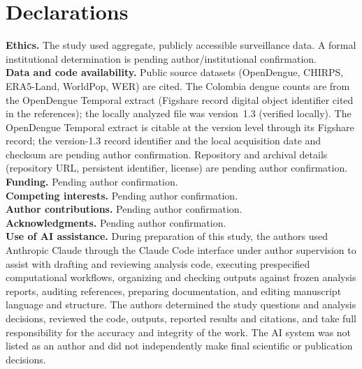 \documentclass[11pt,a4paper]{article}
\begin{document}
\section*{Declarations}
\textbf{Ethics.} The study used aggregate, publicly accessible surveillance data. A formal institutional determination is pending author/institutional confirmation.\\
\textbf{Data and code availability.} Public source datasets (OpenDengue, CHIRPS, ERA5-Land, WorldPop, WER) are cited. The Colombia dengue counts are from the OpenDengue Temporal extract (Figshare record digital object identifier cited in the references); the locally analyzed file was version~1.3 (verified locally). The OpenDengue Temporal extract is citable at the version level through its Figshare record; the version-1.3 record identifier and the local acquisition date and checksum are pending author confirmation. Repository and archival details (repository URL, persistent identifier, license) are pending author confirmation.\\
\textbf{Funding.} Pending author confirmation.\\
\textbf{Competing interests.} Pending author confirmation.\\
\textbf{Author contributions.} Pending author confirmation.\\
\textbf{Acknowledgments.} Pending author confirmation.\\
\textbf{Use of AI assistance.} During preparation of this study, the authors used Anthropic Claude through the Claude Code interface under author supervision to assist with drafting and reviewing analysis code, executing prespecified computational workflows, organizing and checking outputs against frozen analysis reports, auditing references, preparing documentation, and editing manuscript language and structure. The authors determined the study questions and analysis decisions, reviewed the code, outputs, reported results and citations, and take full responsibility for the accuracy and integrity of the work. The AI system was not listed as an author and did not independently make final scientific or publication decisions.
\end{document}
